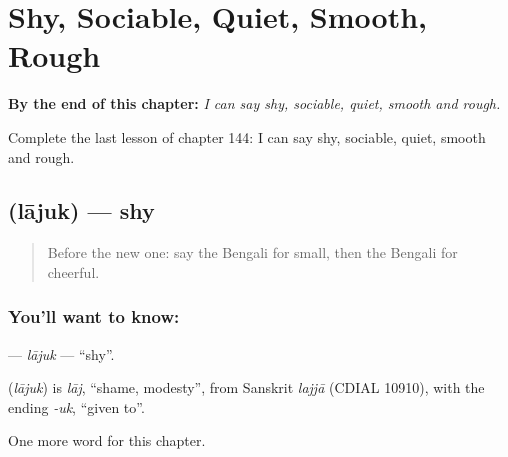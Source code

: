 
\chapter{Shy, Sociable, Quiet, Smooth, Rough}
\label{ch:bn-shy-sociable-quiet-smooth-rough}

\begin{chapteropening}
\textbf{By the end of this chapter:} \emph{I can say shy, sociable, quiet, smooth and rough.}

Complete the last lesson of chapter 144: I can say shy, sociable, quiet, smooth and rough.
\end{chapteropening}

\section[\texorpdfstring{\bn{লাজুক} (lājuk)}{লাজুক (lājuk)}]{ (lājuk) — shy}

\label{lesson:BN-C144-lajuk}



\begin{quote}
Before the new one: say the Bengali for small, then the Bengali for cheerful.
\end{quote}

\subsection*{You'll want to know: }
\textbf{} — \emph{lājuk} — \textquotedblleft{}shy\textquotedblright{}.

\begin{cousinweb}
\textbf{} (\emph{lājuk}) is \emph{lāj}, \textquotedblleft{}shame, modesty\textquotedblright{}, from Sanskrit \emph{lajjā} (CDIAL 10910), with the ending \emph{-uk}, \textquotedblleft{}given to\textquotedblright{}.
\end{cousinweb}

\begin{grammarlens}[title={What you've built}]
One more word for this chapter.
\end{grammarlens}

